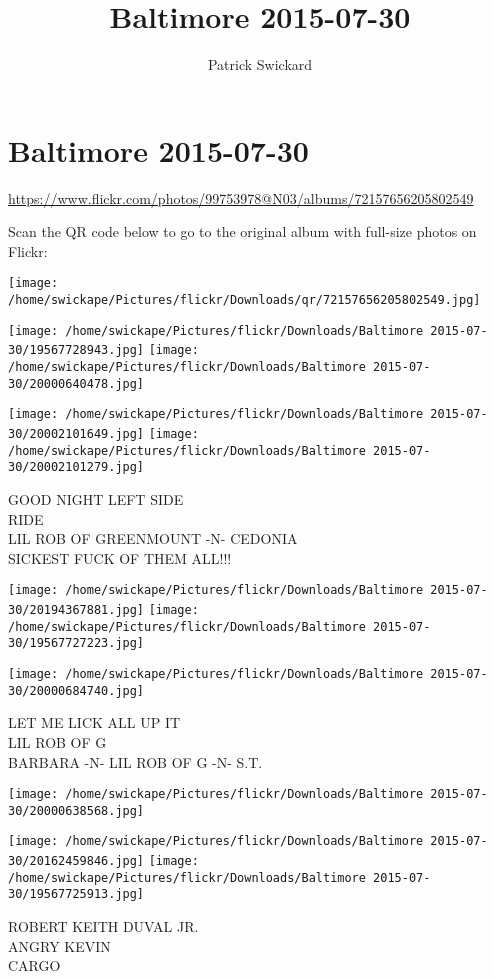 \documentclass[10pt,letterpaper]{article}
\title{Baltimore 2015-07-30}
\author{Patrick Swickard}
\date{}
\begin{document}
\section*{Baltimore 2015-07-30}

\url{https://www.flickr.com/photos/99753978@N03/albums/72157656205802549}

Scan the QR code below to go to the original album with full-size photos on Flickr:

\texttt{[image: /home/swickape/Pictures/flickr/Downloads/qr/72157656205802549.jpg]}
\pagebreak

\texttt{[image: /home/swickape/Pictures/flickr/Downloads/Baltimore 2015-07-30/19567728943.jpg]}
\texttt{[image: /home/swickape/Pictures/flickr/Downloads/Baltimore 2015-07-30/20000640478.jpg]}

\texttt{[image: /home/swickape/Pictures/flickr/Downloads/Baltimore 2015-07-30/20002101649.jpg]}
\texttt{[image: /home/swickape/Pictures/flickr/Downloads/Baltimore 2015-07-30/20002101279.jpg]}

GOOD NIGHT LEFT SIDE\\
RIDE\\
LIL ROB OF GREENMOUNT {-}N{-} CEDONIA\\
SICKEST FUCK OF THEM ALL!!!
\pagebreak

\texttt{[image: /home/swickape/Pictures/flickr/Downloads/Baltimore 2015-07-30/20194367881.jpg]}
\texttt{[image: /home/swickape/Pictures/flickr/Downloads/Baltimore 2015-07-30/19567727223.jpg]}

\texttt{[image: /home/swickape/Pictures/flickr/Downloads/Baltimore 2015-07-30/20000684740.jpg]}

LET ME LICK ALL UP IT\\
LIL ROB OF G\\
BARBARA {-}N{-} LIL ROB OF G {-}N{-} S.T.
\pagebreak

\texttt{[image: /home/swickape/Pictures/flickr/Downloads/Baltimore 2015-07-30/20000638568.jpg]}

\vspace{0.25in}
\texttt{[image: /home/swickape/Pictures/flickr/Downloads/Baltimore 2015-07-30/20162459846.jpg]}
\texttt{[image: /home/swickape/Pictures/flickr/Downloads/Baltimore 2015-07-30/19567725913.jpg]}

ROBERT KEITH DUVAL JR.\\
ANGRY KEVIN\\
CARGO
\pagebreak
\end{document}
